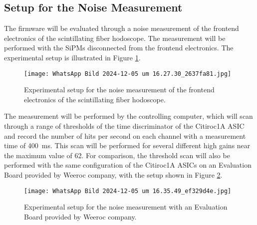 \subsection{Setup for the Noise Measurement}
The firmware will be evaluated through a noise measurement of the frontend electronics of the scintillating fiber hodoscope. 
The measurement will be performed with the SiPMs disconnected from the frontend electronics. 
The experimental setup is illustrated in Figure \ref{fig:noise_setup}.
\begin{figure}[H]
    \centering
    \texttt{[image: WhatsApp Bild 2024-12-05 um 16.27.30\_2637fa81.jpg]}%
    \caption{Experimental setup for the noise measurement of the frontend electronics of the scintillating fiber hodoscope.}
    \label{fig:noise_setup}
\end{figure}
The measurement will be performed by the controlling computer, 
which will scan through a range of thresholds of the time discriminator of the Citiroc1A ASIC and record the number of hits per second on each channel with a measurement time of \SI{400}{\milli\second}.
This scan will be performed for several different high gains near the maximum value of 62.
\newline
For comparison, the threshold scan will also be performed with the same configuration of the Citiroc1A ASICs on an Evaluation Board provided by Weeroc company, 
with the setup shown in Figure \ref{fig:noise_setup_testboard}.
\begin{figure}[H]
    \centering
    \texttt{[image: WhatsApp Bild 2024-12-05 um 16.35.49\_ef329d4e.jpg]}%
    \caption{Experimental setup for the noise measurement with an Evaluation Board provided by Weeroc company.}
    \label{fig:noise_setup_testboard}
\end{figure}

